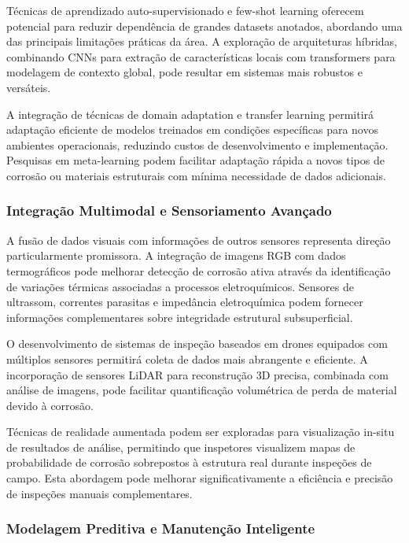 \documentclass[12pt,a4paper,twoside]{article}
\begin{document}
Técnicas de aprendizado auto-supervisionado e few-shot learning oferecem potencial para reduzir dependência de grandes datasets anotados, abordando uma das principais limitações práticas da área. A exploração de arquiteturas híbridas, combinando CNNs para extração de características locais com transformers para modelagem de contexto global, pode resultar em sistemas mais robustos e versáteis.

A integração de técnicas de domain adaptation e transfer learning permitirá adaptação eficiente de modelos treinados em condições específicas para novos ambientes operacionais, reduzindo custos de desenvolvimento e implementação. Pesquisas em meta-learning podem facilitar adaptação rápida a novos tipos de corrosão ou materiais estruturais com mínima necessidade de dados adicionais.

\subsubsection{Integração Multimodal e Sensoriamento Avançado}

A fusão de dados visuais com informações de outros sensores representa direção particularmente promissora. A integração de imagens RGB com dados termográficos pode melhorar detecção de corrosão ativa através da identificação de variações térmicas associadas a processos eletroquímicos. Sensores de ultrassom, correntes parasitas e impedância eletroquímica podem fornecer informações complementares sobre integridade estrutural subsuperficial.

O desenvolvimento de sistemas de inspeção baseados em drones equipados com múltiplos sensores permitirá coleta de dados mais abrangente e eficiente. A incorporação de sensores LiDAR para reconstrução 3D precisa, combinada com análise de imagens, pode facilitar quantificação volumétrica de perda de material devido à corrosão.

Técnicas de realidade aumentada podem ser exploradas para visualização in-situ de resultados de análise, permitindo que inspetores visualizem mapas de probabilidade de corrosão sobrepostos à estrutura real durante inspeções de campo. Esta abordagem pode melhorar significativamente a eficiência e precisão de inspeções manuais complementares.

\subsubsection{Modelagem Preditiva e Manutenção Inteligente}
\end{document}
